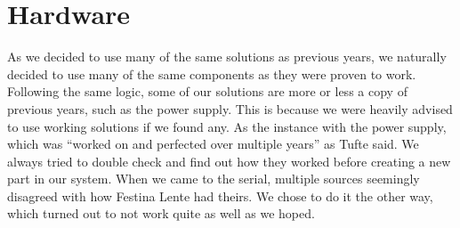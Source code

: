 \section {Hardware}

As we decided to use many of the same solutions as previous years, we naturally
decided to use many of the same components as they were proven to
work. Following the same logic, some of our solutions are more or less a copy of
previous years, such as the power supply. This is because we were heavily
advised to use working solutions if we found any.  As the instance with the power supply, which
was ``worked on and perfected over multiple years'' as Tufte said. We always
tried to double check and find out how they worked before creating a new part in
our system. When we came to the serial, multiple sources seemingly disagreed
with how Festina Lente had theirs. We chose to do it
the other way, which turned out to not work quite as well
as we hoped.
